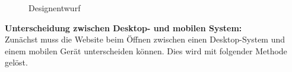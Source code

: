 	
\begin{figure}[H]
\begin{center}
\caption{Designentwurf}
\end{center}
\end{figure}

\textbf{Unterscheidung zwischen Desktop- und mobilen System:}
\\
Zunächst muss die Website beim Öffnen zwischen einen Desktop-System und einem mobilen Gerät unterscheiden können. Dies wird mit folgender Methode gelöst.

